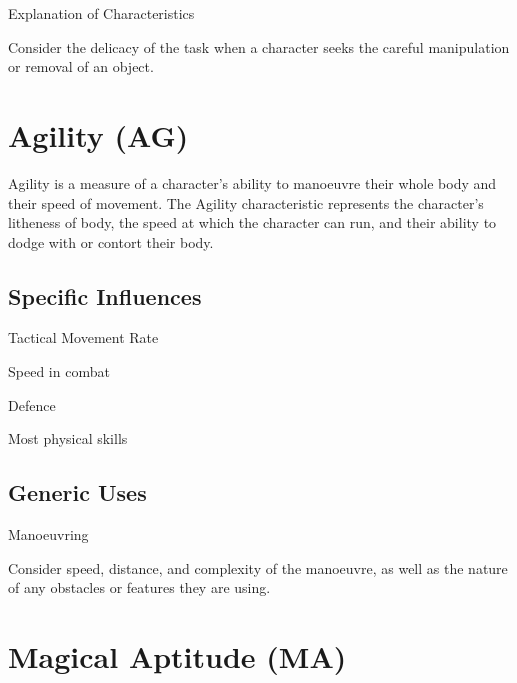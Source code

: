 \begin{Chapter}{Explanation of Characteristics}
\begin{Itemize}
\end{Itemize}

\begin{example}
Consider the delicacy of the task when a character seeks the careful
manipulation or removal of an object.
\end{example}


\section{Agility (AG)}

Agility is a measure of a character’s ability to manoeuvre their whole
body and their speed of movement.  The Agility characteristic
represents the character’s litheness of body, the speed at which the
character can run, and their ability to dodge with or contort their
body.

\subsection{Specific Influences}

\begin{Itemize}

\item Tactical Movement Rate

\item Speed in combat

\item Defence

\item Most physical skills 

\end{Itemize}

\subsection{Generic Uses}

\begin{Itemize}

\item Manoeuvring 

\end{Itemize}

\begin{example}
Consider speed, distance, and complexity of the manoeuvre, as well as
the nature of any obstacles or features they are using.
\end{example}


\section{Magical Aptitude (MA)}


\end{Chapter}
